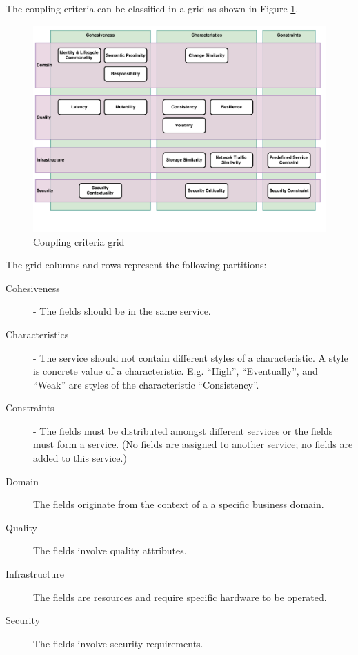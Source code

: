 The coupling criteria can be classified in a grid as shown in Figure \ref{fig:cc_grid}.

\begin{figure}[H]
	\includegraphics[scale=0.5]{diagrams/CouplingCatalog.pdf}
	\caption{Coupling criteria grid}
	\label{fig:cc_grid}
\end{figure}

The grid columns and rows represent the following partitions:

\begin{description}
	\item[Cohesiveness] - The fields should be in the same service.	\item[Characteristics] - The service should not contain different styles of a characteristic. A style is concrete value of a characteristic. E.g. \enquote{High}, \enquote{Eventually}, and \enquote{Weak} are styles of the characteristic \enquote{Consistency}.
	\item[Constraints] - The fields must be distributed amongst different services or the fields must form a service. (No fields are assigned to another service; no fields are added to this service.)
	\item[Domain] The fields originate from the context of a a specific business domain.
	\item[Quality] The fields involve quality attributes.
	\item[Infrastructure] The fields are resources and require specific hardware to be operated.
	\item[Security] The fields involve security requirements.

\end{description}

